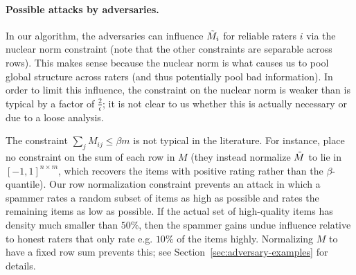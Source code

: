 \paragraph{Possible attacks by adversaries.} In our algorithm, 
the adversaries can influence $\tilde{M}_i$ for reliable raters $i$ via 
the nuclear norm constraint (note that the other constraints are 
separable across rows). This makes sense because 
the nuclear norm is what causes us to pool global structure across 
raters (and thus potentially pool bad information). In order to 
limit this influence, the constraint on the 
nuclear norm is weaker than is typical by a factor of $\frac{2}{\epsilon}$; 
it is not clear to us whether this is actually necessary or due to a 
loose analysis.

The constraint $\sum_j M_{ij} \leq \beta m$ is 
not typical in the literature. For instance,  
place no 
constraint on the sum of each row in $M$ (they instead normalize 
$\tilde{M}$ to lie in $[-1,1]^{n \times m}$, which 
recovers the items with positive rating rather than the $\beta$-quantile).
Our row normalization constraint prevents an attack 
in which a spammer rates a random subset of items as high as possible and 
rates the remaining items as low as possible. If the actual set of 
high-quality items has density much smaller than $50\%$, then the 
spammer gains undue influence relative to honest raters that 
only rate e.g. $10\%$ of the items highly. Normalizing $M$ to 
have a fixed row sum prevents this; see Section~\ref{sec:adversary-examples} 
for details.
